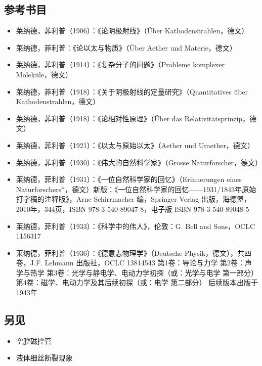 \subsection{参考书目}
\begin{itemize}
\item 莱纳德，菲利普（1906）：《论阴极射线》（Über Kathodenstrahlen，德文）
\item 莱纳德，菲利普：《论以太与物质》（Über Aether und Materie，德文）
\item 莱纳德，菲利普（1914）：《复杂分子的问题》（Probleme komplexer Moleküle，德文）
\item 莱纳德，菲利普（1918）：《关于阴极射线的定量研究》（Quantitatives über Kathodenstrahlen，德文）
\item 莱纳德，菲利普（1918）：《论相对性原理》（Über das Relativitätsprinzip，德文）
\item 莱纳德，菲利普（1921）：《以太与原始以太》（Aether und Uraether，德文）
\item 莱纳德，菲利普（1930）：《伟大的自然科学家》（Grosse Naturforscher，德文）
\item 莱纳德，菲利普（1931）：《一位自然科学家的回忆》（Erinnerungen eines Naturforschers*，德文）新版：《一位自然科学家的回忆——1931/1843年原始打字稿的注释版》，Arne Schirrmacher 编，Springer Verlag 出版，海德堡，2010年，344页，ISBN 978-3-540-89047-8，电子版 ISBN 978-3-540-89048-5
\item 莱纳德，菲利普（1933）：《科学中的伟人》，伦敦：G. Bell and Sons，OCLC 1156317
\item 莱纳德，菲利普（1936）：《德意志物理学》（Deutsche Physik，德文），共四卷，J.F. Lehmann 出版社，OCLC 13814543
第1卷：导论与力学
第2卷：声学与热学
第3卷：光学与静电学、电动力学初探（或：光学与电学 第一部分）
第4卷：磁学、电动力学及其后续初探（或：电学 第二部分）
后续版本出版于1943年
\end{itemize}
\subsection{另见}
\begin{itemize}
\item 空腔磁控管
\item 液体细丝断裂现象
\end{itemize}
